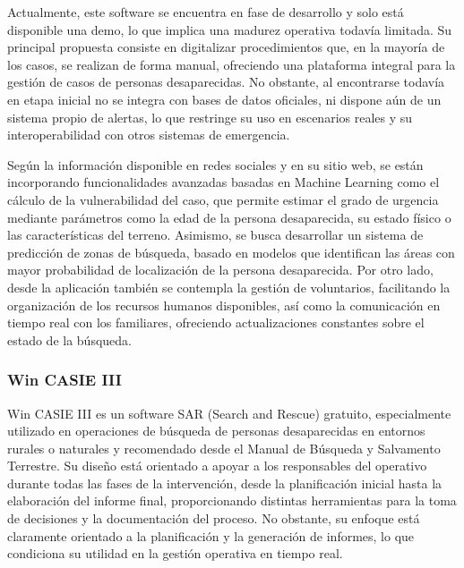     Actualmente, este software se encuentra en fase de desarrollo y solo está disponible una demo, lo que implica una madurez operativa todavía limitada. Su principal propuesta consiste en digitalizar procedimientos que, en la mayoría de los casos, se realizan de forma manual, ofreciendo una plataforma integral para la gestión de casos de personas desaparecidas. No obstante, al encontrarse todavía en etapa inicial no se integra con bases de datos oficiales, ni dispone aún de un sistema propio de alertas, lo que restringe su uso en escenarios reales y su interoperabilidad con otros sistemas de emergencia.
    
    Según la información disponible en redes sociales y en su sitio web, se están incorporando funcionalidades avanzadas basadas en Machine Learning como el cálculo de la vulnerabilidad del caso, que permite estimar el grado de urgencia mediante parámetros como la edad de la persona desaparecida, su estado físico o las características del terreno. Asimismo, se busca desarrollar un sistema de predicción de zonas de búsqueda, basado en modelos que identifican las áreas con mayor probabilidad de localización de la persona desaparecida. Por otro lado, desde la aplicación también se contempla la gestión de voluntarios, facilitando la organización de los recursos humanos disponibles, así como la comunicación en tiempo real con los familiares, ofreciendo actualizaciones constantes sobre el estado de la búsqueda. 
        

    \subsubsection{Win CASIE III}

    Win CASIE III es un software SAR (Search and Rescue) gratuito\cite{WCASIE3}, especialmente utilizado en operaciones de búsqueda de personas desaparecidas en entornos rurales o naturales y recomendado desde el Manual de Búsqueda y Salvamento Terrestre\cite{ManualDeBusquedayRescate}. Su diseño está orientado a apoyar a los responsables del operativo durante todas las fases de la intervención, desde la planificación inicial hasta la elaboración del informe final, proporcionando distintas herramientas para la toma de decisiones y la documentación del proceso. No obstante, su enfoque está claramente orientado a la planificación y la generación de informes, lo que condiciona su utilidad en la gestión operativa en tiempo real.

